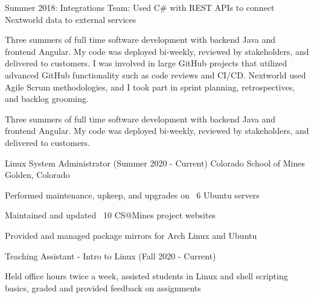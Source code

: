 \begin{cventries}
{\begin{cvitems}
    \item {Summer 2018: Integrations Team: Used C\# with REST APIs to connect Nextworld data to external services }
    \fi
      \end{cvitems}
    }
    {
      \ifcv
      \begin{cventrysummary}
        Three summers of full time software development with backend Java and frontend Angular. 
        My code was deployed bi-weekly, reviewed by stakeholders, and delivered to customers.
        I was involved in large GitHub projects that utilized advanced GitHub functionality such as code reviews and CI/CD.
        Nextworld used Agile Scrum methodologies, and I took part in sprint planning, retrospectives, and backlog grooming.
      \end{cventrysummary}
      \else
      \begin{cventrysummary}
        Three summers of full time software development with backend Java and frontend Angular.
        My code was deployed bi-weekly, reviewed by stakeholders, and delivered to customers.
      \end{cventrysummary}
      \fi
    }

    \cventry
    {Linux System Administrator (Summer 2020 - Current)}
    {Colorado School of Mines}
    {Golden, Colorado}
    {}
    {
        \begin{cvitems}
        \item Performed maintenance, upkeep, and upgrades on ~6 Ubuntu servers
        \item Maintained and updated ~10 CS@Mines project websites
        \item Provided and managed package mirrors for Arch Linux and Ubuntu
        \end{cvitems}
    }
    {}

    \vspace{-1.0mm}
    \cventry
    {Teaching Assistant - Intro to Linux (Fall 2020 - Current)}
    {}
    {}
    {}
    {
        \begin{cvitems}
        \item Held office hours twice a week, assisted students in Linux and shell scripting basics, graded and provided feedback on assignments
        \end{cvitems}
    }
    {}



\end{cventries}
